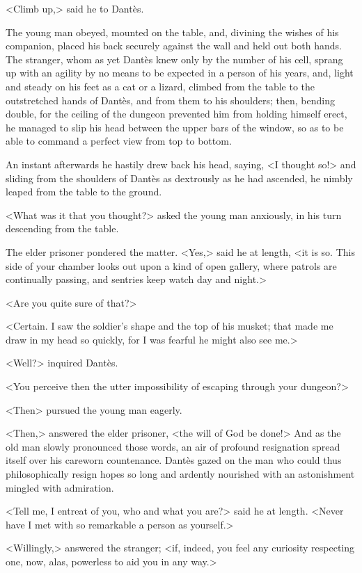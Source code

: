  <Climb up,> said he to Dantès. 

 The young man obeyed, mounted on the table, and, divining the wishes of his companion, placed his back securely against the wall and held out both hands. The stranger, whom as yet Dantès knew only by the number of his cell, sprang up with an agility by no means to be expected in a person of his years, and, light and steady on his feet as a cat or a lizard, climbed from the table to the outstretched hands of Dantès, and from them to his shoulders; then, bending double, for the ceiling of the dungeon prevented him from holding himself erect, he managed to slip his head between the upper bars of the window, so as to be able to command a perfect view from top to bottom. 

 An instant afterwards he hastily drew back his head, saying, <I thought so!> and sliding from the shoulders of Dantès as dextrously as he had ascended, he nimbly leaped from the table to the ground. 

 <What was it that you thought?> asked the young man anxiously, in his turn descending from the table. 

 The elder prisoner pondered the matter. <Yes,> said he at length, <it is so. This side of your chamber looks out upon a kind of open gallery, where patrols are continually passing, and sentries keep watch day and night.> 

 <Are you quite sure of that?> 

 <Certain. I saw the soldier's shape and the top of his musket; that made me draw in my head so quickly, for I was fearful he might also see me.> 

 <Well?> inquired Dantès. 

 <You perceive then the utter impossibility of escaping through your dungeon?> 

 <Then\longdash> pursued the young man eagerly. 

 <Then,> answered the elder prisoner, <the will of God be done!> And as the old man slowly pronounced those words, an air of profound resignation spread itself over his careworn countenance. Dantès gazed on the man who could thus philosophically resign hopes so long and ardently nourished with an astonishment mingled with admiration. 

 <Tell me, I entreat of you, who and what you are?> said he at length. <Never have I met with so remarkable a person as yourself.> 

 <Willingly,> answered the stranger; <if, indeed, you feel any curiosity respecting one, now, alas, powerless to aid you in any way.> 

